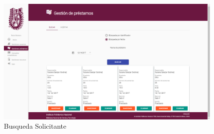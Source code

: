 \begin{enumerate}
\begin{figure}[hbtp]
	\includegraphics[scale=0.3]{images/Interfaz/IUGS07_busqueda.PNG}
	\caption{Busqueda Solicitante}
	\end{figure}
	
\end{enumerate}

